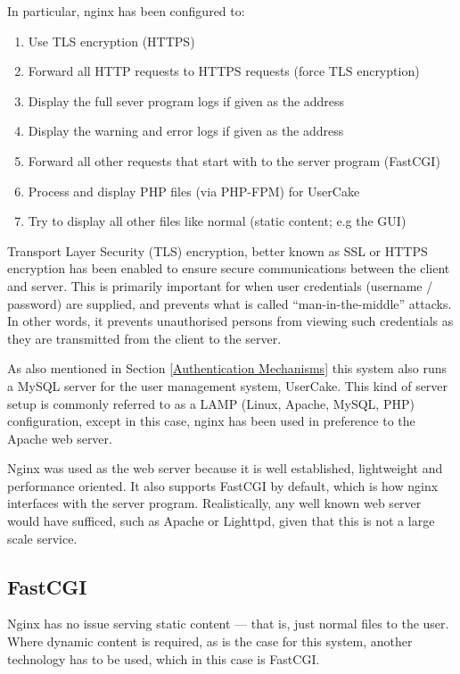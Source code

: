 In particular, nginx has been configured to:
\begin{enumerate}
	\item Use TLS encryption (HTTPS)
	\item Forward all HTTP requests to HTTPS requests (force TLS encryption)
	\item Display the full sever program logs if given  as the address
	\item Display the warning and error logs if given  as the address
	\item Forward all other requests that start with \api{} to the server program (FastCGI)
	\item Process and display PHP files (via PHP-FPM) for UserCake
	\item Try to display all other files like normal (static content; e.g the GUI)
\end{enumerate}

Transport Layer Security (TLS) encryption, better known as SSL or HTTPS encryption has been enabled to ensure secure communications between the client and server. This is primarily important for when user credentials (username / password) are supplied, and prevents what is called ``man-in-the-middle'' attacks. In other words, it prevents unauthorised persons from viewing such credentials as they are transmitted from the client to the server. 

As also mentioned in Section \ref{Authentication Mechanisms} this system also runs a MySQL server for the user management system, UserCake. This kind of server setup is commonly referred to as a LAMP (Linux, Apache, MySQL, PHP) configuration\cite{lamp}, except in this case, nginx has been used in preference to the Apache web server. 

Nginx was used as the web server because it is well established, lightweight and performance oriented. It also supports FastCGI by default, which is how nginx interfaces with the server program. Realistically, any well known web server would have sufficed, such as Apache or Lighttpd, given that this is not a large scale service.

\subsection{FastCGI}

Nginx has no issue serving static content --- that is, just normal files to the user. Where dynamic content is required, as is the case for this system, another technology has to be used, which in this case is FastCGI.

